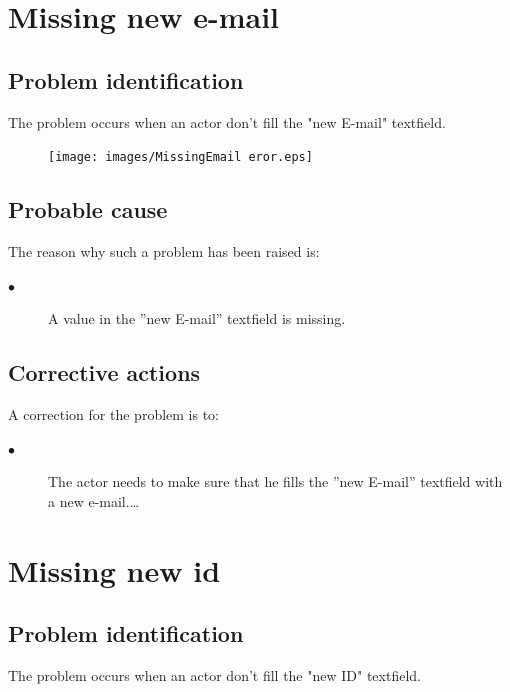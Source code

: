 \section{Missing new e-mail} 

\subsection{Problem identification}
The problem occurs when an actor don't fill the "new E-mail" textfield.

\begin{figure}[H]
\centering
\texttt{[image: images/MissingEmail eror.eps]}
\caption{\label{overflow}}
\end{figure}

\subsection{Probable cause}

The reason why such a problem has been raised is:\\
\begin{description}
\item[$\bullet$] A value in the ''new E-mail'' textfield is missing.
\end{description}


\subsection{Corrective actions}

A correction for the problem is to:\\
\begin{description}
\item[$\bullet$] The actor needs to make sure that he fills the
''new E-mail'' textfield with a new e-mail.\ldots

\end{description}




\section{Missing new id} 

\subsection{Problem identification}
The problem occurs when an actor don't fill the "new ID" textfield.

